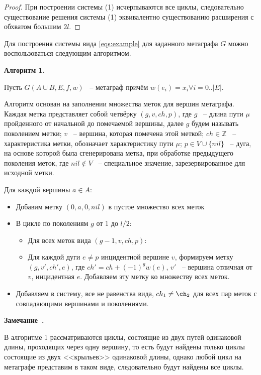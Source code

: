 \documentclass[14pt]{mmcs-article}
\newcounter{notice}[section]
\newenvironment{notice}[1][]{\refstepcounter{notice}\par\medskip
    \noindent \textbf{Замечание~\thenotice. #1} \rmfamily
}
{\medskip}
\begin{document}
\begin{proof}

При построении системы (1) исчерпываются все циклы, следовательно существование решения системы (1) эквивалентно существованию расширения с обхватом большим $2l$.

\end{proof}

Для построения системы вида \ref{eqs:example} для заданного метаграфа $G$ можно воспользоваться следующим алгоритмом.

\textbf{Алгоритм 1.}

Пусть $G(A \cup B, E, f, w)$ ~-- метаграф причём $w(e_i) = x_i \forall i = 0..|E|$.

Алгоритм основан на заполнении множества меток для вершин метаграфа. Каждая метка представляет собой четвёрку $(g, v, ch, p)$, где $g$ ~-- длина пути $\mu$ пройденного от начальной до помечаемой вершины, далее $g$ будем называть поколением метки; $v$ ~-- вершина, которая помечена этой меткой; $ch \in \mathbb{Z}$ ~-- характеристика метки, обозначает характеристику пути $\mu$; $p \in V \cup \{ nil \}$ ~-- дуга, на основе которой была сгенерирована метка, при обработке предыдущего поколения меток, где $nil \not\in V $ ~-- специальное значение, зарезервированное для исходной метки.

Для каждой вершины $a \in A$:

\begin{itemize}
    \item Добавим метку $(0, a, 0, nil)$ в пустое множество всех меток
    \item В цикле по поколениям $g$ от $1$ до $l / 2$:
    \begin{itemize}
        \item Для всех меток вида $(g - 1, v, ch, p)$:
        \item
            Для каждой дуги $e \not= p$ инцидентной вершине $v$,
            формируем метку $(g, v', ch', e)$, где $ch' = ch + (-1)^{g} w(e)$, $v'$ ~-- вершина отличная от $v$, инцидентная $e$.
            Добавляем эту метку ко множеству всех меток.
    \end{itemize}
    \item Добавляем в систему, все не равенства вида, $ch_1 \neq \ch_2$ для всех пар меток с совпадающими вершинами и поколениями.
\end{itemize}

\begin{notice}
    В алгоритме 1  рассматриваются циклы, состоящие из двух путей одинаковой длины, проходящих через одну вершину, то есть будут найдены только циклы состоящие из двух <<крыльев>> одинаковой длины, однако любой цикл на метаграфе представим в таком виде, следовательно будут найдены все циклы.
\end{notice}
\end{document}
